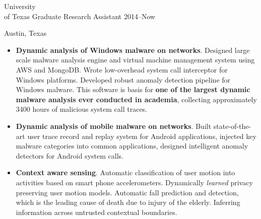 \documentclass[]{friggeri-cv} %
\begin{document}
\begin{entrylist}


\entry
{University \\ of Texas}
{Graduate Research Assistant}
{2014--Now}
{Austin, Texas \\
\begin{itemize}
\item \textbf{Dynamic analysis of Windows malware on networks}. Designed large scale malware analysis engine and virtual machine management system using AWS and MongoDB. Wrote low-overhead system call interceptor for Windows platforms. Developed robust anomaly detection pipeline for Windows malware. This software is basis for \textbf{one of the largest dynamic malware analysis ever conducted in academia}, collecting approximately 3400 hours of malicious system call traces.
\item \textbf{Dynamic analysis of mobile malware on networks}. Built state-of-the-art user trace record and replay system for Android applications, injected key malware categories into common applications, designed intelligent anomaly detectors for Android system calls.
\item \textbf{Context aware sensing}. Automatic classification of user motion into activities based on smart phone accelerometers. Dynamically \textit{learned} privacy preserving user motion models. Automatic fall prediction and detection, which is the leading cause of death due to injury of the elderly. Inferring information across untrusted contextual boundaries. 
\end{itemize} }

\end{entrylist}
\end{document}
